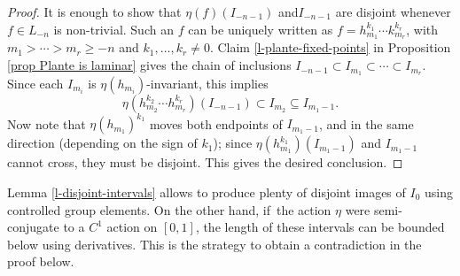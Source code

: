 \documentclass[10pt]{amsart}
\theoremstyle{definition}
\begin{document}
\begin{proof}
It is enough to show that $\eta(f)(I_{-n-1})$ and$I_{-n-1}$ are disjoint whenever $f\in L_{-n}$ is non-trivial. Such an $f$ can be uniquely written as $f=h_{m_1}^{k_1}\cdots k_{m_r}^{k_r}$, with $m_1>\cdots >m_r\ge -n$ and $k_1,\ldots, k_r\neq 0$. Claim \ref{l-plante-fixed-points} in Proposition \ref{prop Plante is laminar} gives the chain of inclusions $I_{-n-1}\subset I_{m_1}\subset \cdots \subset I_{m_r}$. Since each $I_{m_i}$ is $\eta(h_{m_i})$-invariant, this implies
\[\eta(h_{m_2}^{k_2}\cdots h_{m_r}^{k_r})(I_{-n-1})\subset I_{m_2}\subseteq I_{m_1-1}.
\]
Now note that $\eta(h_{m_1})^{k_1}$ moves both endpoints of $I_{m_1-1}$, and in the same direction (depending on the sign of $k_1$); since $\eta(h_{m_1}^{k_1})(I_{m_1-1})$ and $I_{m_1-1}$ cannot cross, they must be disjoint. This gives the desired conclusion.
\end{proof}

Lemma \ref{l-disjoint-intervals} allows to produce plenty of disjoint images of $I_0$ using controlled group elements. On the other hand, if~the action $\eta$ were semi-conjugate to a $C^1$ action on $[0, 1]$, the length of these intervals can be bounded below using derivatives. This is the strategy to obtain a contradiction in the proof below.
\end{document}
